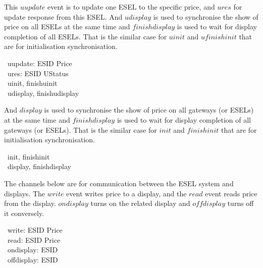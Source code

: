 %

This $uupdate$ event is to update one ESEL to the specific price, and $ures$ for update response from this ESEL.
And $udisplay$ is used to synchronise the show of price on all ESELs at the same time and $finishdisplay$ is used to wait for display completion of all ESELs. That is the similar case for $uinit$ and $ufinishinit$ that are for initialisation synchronisation.
\begin{circus}
	\circchannel\ uupdate: ESID \cross Price \\
	\circchannel\ ures: ESID \cross UStatus \\
	\circchannel\ uinit, finishuinit\\
	\circchannel\ udisplay, finishudisplay
\end{circus}

And $display$ is used to synchronise the show of price on all gateways (or ESELs) at the same time and $finishdisplay$ is used to wait for display completion of all gateways (or ESELs). That is the similar case for $init$ and $finishinit$ that are for initialisation synchronisation.
\begin{circus}
	\circchannel\ init, finishinit \\
	\circchannel\ display, finishdisplay
\end{circus}

The channels below are for communication between the ESEL system and displays. The $write$ event writes price to a display, and the $read$ event reads price from the display. $ondisplay$ turns on the related display and $offdisplay$ turns off it conversely.
\begin{circus}
	\circchannel\ write: ESID \cross Price \\
	\circchannel\ read: ESID \cross Price \\
	\circchannel\ ondisplay: ESID \\
	\circchannel\ offdisplay: ESID
\end{circus}

